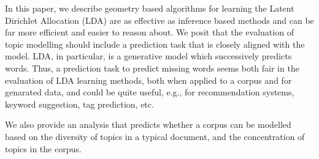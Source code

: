 
In this paper, we describe geometry based algorithms for learning the
Latent Dirichlet Allocation (LDA) are as effective as inference based
methods and can be far more efficient and easier to reason about.  We
posit that the evaluation of topic modelling should include a
prediction task that is closely aligned with the model. LDA, in
particular, is a generative model which successively predicts words.
Thus, a prediction task to predict missing words seems both fair in
the evaluation of LDA learning methods, both when applied to a corpus
and for genarated data, and could be quite useful, e.g., for
recommendation systems, keyword suggestion, tag prediction, etc. 

We also provide an analysis that predicts whether a corpus can be
modelled based on the diversity of topics in a typical document, and
the concentration of topics in the corpus.



